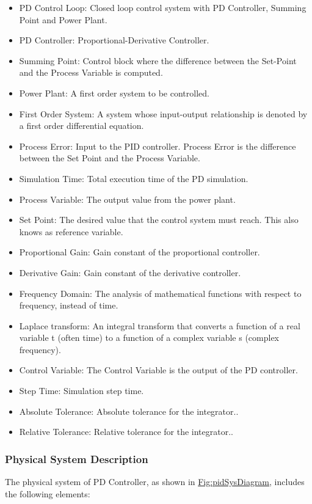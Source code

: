 \documentclass[12pt]{article}
\begin{document}
\begin{itemize}
\item{PD Control Loop: Closed loop control system with PD Controller, Summing Point and Power Plant.}
\item{PD Controller: Proportional-Derivative Controller.}
\item{Summing Point: Control block where the difference between the Set-Point and the Process Variable is computed.}
\item{Power Plant: A first order system to be controlled.}
\item{First Order System: A system whose input-output relationship is denoted by a first order differential equation.}
\item{Process Error: Input to the PID controller. Process Error is the difference between the Set Point and the Process Variable.}
\item{Simulation Time: Total execution time of the PD simulation.}
\item{Process Variable: The output value from the power plant.}
\item{Set Point: The desired value that the control system must reach. This also knows as reference variable.}
\item{Proportional Gain: Gain constant of the proportional controller.}
\item{Derivative Gain: Gain constant of the derivative controller.}
\item{Frequency Domain: The analysis of mathematical functions with respect to frequency, instead of time.}
\item{Laplace transform: An integral transform that converts a function of a real variable t (often time) to a function of a complex variable s (complex frequency).}
\item{Control Variable: The Control Variable is the output of the PD controller.}
\item{Step Time: Simulation step time.}
\item{Absolute Tolerance: Absolute tolerance for the integrator..}
\item{Relative Tolerance: Relative tolerance for the integrator..}
\end{itemize}
\subsubsection{Physical System Description}
\label{Sec:PhysSyst}
The physical system of PD Controller, as shown in \hyperref[Figure:pidSysDiagram]{Fig:pidSysDiagram}, includes the following elements:
\end{document}

